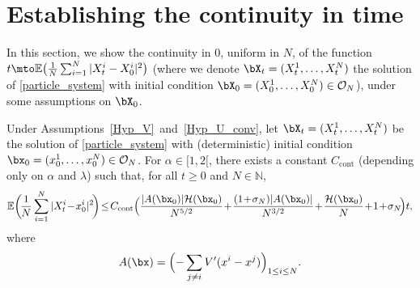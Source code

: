 \section{Establishing the continuity in time}\label{cont_0_alpha_1}

In this section, we show the continuity in 0, uniform in $N$, of the function $t\mto\mathbb{E}\bigl(\frac{1}{N}\sum_{i=1}^N|X^i_t-X^i_0|^2\bigr)$ (where we denote $\bX_t=(X^1_t,\dots,X^N_t)$ the solution of \eqref{particle_system} with initial condition $\bX_0=(X^1_0,\dots,X^N_0)\in\mathcal{O}_N$), under some assumptions on $\bX_0$.

\begin{lemma}\label{mod_cont}
Under Assumptions~\ref{Hyp_V}~and~\ref{Hyp_U_conv}, let $\bX_t=(X^1_t,\dots,X^N_t)$ be the solution of \eqref{particle_system} with (deterministic) initial condition $\bx_0=(x^1_0,\dots,x^N_0)\in\mathcal{O}_N$. For $\alpha\in[1,2[$, there exists a constant $C_\mathrm{cont}$ (depending only on $\alpha$ and $\lambda$) such that, for all $t\geq0$ and $N\in\mathbb{N}$,
\begin{align*}
\mathbb{E}\biggl(\!\frac{1}{N}\sum_{i=1}^N|X^i_t\!-\!x^i_0|^2\!\biggr)\!\leq\! C_\mathrm{cont}\Bigl(\frac{|A(\bx_0)|\mathcal{H}(\bx_0)}{N^{5/2}}\!+\!\frac{(1\!+\!\sigma_N)|A(\bx_0)|}{N^{3/2}}\!+\!\frac{\mathcal{H}(\bx_0)}{N}\!+\!1\!+\!\sigma_N\!\Bigr)t,
\end{align*}
where
\begin{equation}\label{def_A}
A(\bx)=\Bigl(-\sum_{j\neq i}V'(x^i-x^j)\Bigr)_{1\leq i\leq N}.
\end{equation}
\end{lemma}

